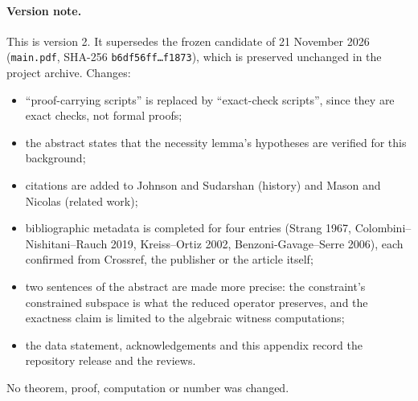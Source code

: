 \documentclass[11pt]{article}
\theoremstyle{plain}
\theoremstyle{definition}
\theoremstyle{remark}
\begin{document}
\paragraph{Version note.} This is version 2. It supersedes the frozen candidate of 21 November 2026 (\texttt{main.pdf}, SHA-256 \texttt{b6df56ff\ldots f1873}), which is preserved unchanged in the project archive. Changes:
\begin{itemize}
  \item ``proof-carrying scripts'' is replaced by ``exact-check scripts'', since they are exact checks, not formal proofs;
  \item the abstract states that the necessity lemma's hypotheses are verified for this background;
  \item citations are added to Johnson and Sudarshan (history) and Mason and Nicolas (related work);
  \item bibliographic metadata is completed for four entries (Strang 1967, Colombini--Nishitani--Rauch 2019, Kreiss--Ortiz 2002, Benzoni-Gavage--Serre 2006), each confirmed from Crossref, the publisher or the article itself;
  \item two sentences of the abstract are made more precise: the constraint's constrained subspace is what the reduced operator preserves, and the exactness claim is limited to the algebraic witness computations;
  \item the data statement, acknowledgements and this appendix record the repository release and the reviews.
\end{itemize}
No theorem, proof, computation or number was changed.



\end{document}

